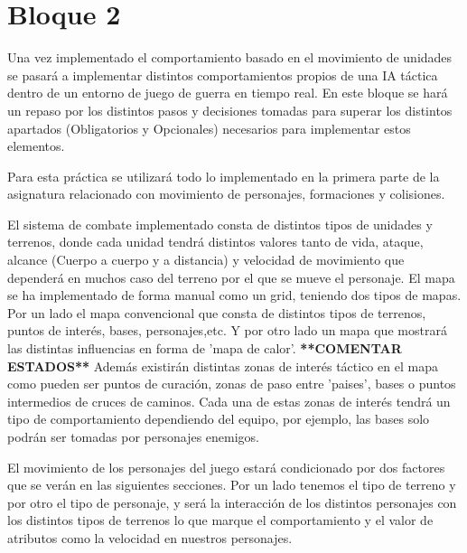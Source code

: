 \part{Bloque 2}

Una vez implementado el comportamiento basado  en el movimiento de unidades se pasará a implementar distintos comportamientos propios de una IA táctica dentro de un entorno de juego de guerra en tiempo real.  En este bloque se hará un repaso por los distintos pasos y decisiones tomadas para superar los distintos apartados (Obligatorios y Opcionales) necesarios para implementar estos elementos.

Para esta práctica se utilizará todo lo implementado en la primera parte de la asignatura relacionado con movimiento de personajes, formaciones y colisiones.

El sistema de combate implementado consta de distintos tipos de unidades y terrenos, donde cada unidad tendrá distintos valores tanto de vida, ataque, alcance (Cuerpo a cuerpo y a distancia) y velocidad de movimiento que dependerá en muchos caso del terreno por el que se mueve el personaje. El mapa se ha implementado de forma manual como un grid, teniendo dos tipos de mapas. Por un lado el mapa convencional que consta de distintos tipos de terrenos, puntos de interés, bases, personajes,etc. Y por otro lado un mapa que mostrará las distintas influencias en forma de 'mapa de calor'.
\textbf{**COMENTAR ESTADOS**}
Además  existirán distintas zonas de interés táctico en el mapa como pueden ser puntos de curación, zonas de paso entre 'paises', bases o puntos intermedios de cruces de caminos. Cada una de estas zonas de interés tendrá un tipo de comportamiento dependiendo del equipo, por ejemplo, las bases solo podrán ser tomadas por personajes enemigos.

El movimiento de los personajes del juego estará condicionado por dos factores que se verán en las siguientes secciones. Por un lado tenemos el tipo de  terreno y por otro el tipo de personaje, y será la interacción de los distintos personajes con los distintos tipos de terrenos lo que marque el comportamiento y el valor de atributos como la velocidad en nuestros personajes.

